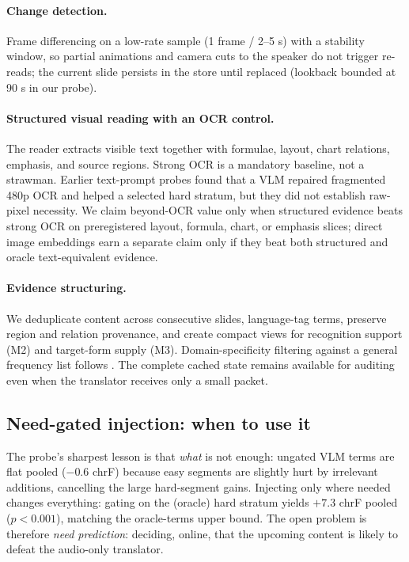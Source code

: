 \paragraph{Change detection.} Frame differencing on a low-rate sample
(1 frame / 2--5 s) with a stability window, so partial animations and camera
cuts to the speaker do not trigger re-reads; the current slide persists in the
store until replaced (lookback bounded at 90 s in our probe).

\paragraph{Structured visual reading with an OCR control.} The reader extracts
visible text together with formulae, layout, chart relations, emphasis, and
source regions. Strong OCR is a mandatory baseline, not a strawman. Earlier
text-prompt probes found that a VLM repaired fragmented 480p OCR and helped a
selected hard stratum, but they did not establish raw-pixel necessity. We claim
beyond-OCR value only when structured evidence beats strong OCR on preregistered
layout, formula, chart, or emphasis slices; direct image embeddings earn a
separate claim only if they beat both structured and oracle text-equivalent
evidence.

\paragraph{Evidence structuring.} We deduplicate content across consecutive
slides, language-tag terms, preserve region and relation provenance, and create
compact views for recognition support (M2) and target-form supply (M3).
Domain-specificity filtering against a general frequency list follows
\citet{sinhamahapatra2025slides}. The complete cached state remains available
for auditing even when the translator receives only a small packet.

\subsection{Need-gated injection: when to use it}
\label{sec:gating}

The probe's sharpest lesson is that \emph{what} is not enough: ungated VLM
terms are flat pooled ($-0.6$ chrF) because easy segments are slightly hurt by
irrelevant additions, cancelling the large hard-segment gains. Injecting only
where needed changes everything: gating on the (oracle) hard stratum yields
$+7.3$ chrF pooled ($p{<}0.001$), matching the oracle-terms upper bound. The
open problem is therefore \emph{need prediction}: deciding, online, that the
upcoming content is likely to defeat the audio-only translator.

